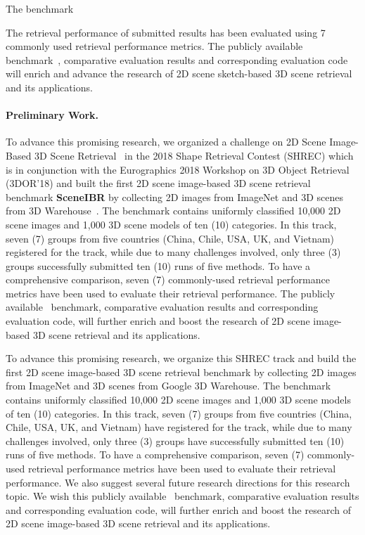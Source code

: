 The benchmark  

The retrieval performance of submitted results has been evaluated using 7 commonly used retrieval performance metrics. The publicly available benchmark~\cite{SHREC18-SceneSBR-Track}, comparative evaluation results and corresponding evaluation code will enrich and advance the research of 2D scene sketch-based 3D scene retrieval and its applications.



\paragraph{Preliminary Work.} 
To advance this promising research, we organized a challenge on 2D Scene Image-Based 3D Scene Retrieval~\cite{DBLP:conf/3dor/AbdulJLL18, SHREC18-SceneIBR-Track} in the 2018 Shape Retrieval Contest (SHREC) which is in conjunction with the Eurographics 2018 Workshop on 3D Object Retrieval (3DOR'18) and built the first 2D scene image-based 3D scene retrieval benchmark \textbf{SceneIBR} by collecting 2D images from ImageNet and 3D scenes from 3D Warehouse~\cite{3DWarehouse}. The benchmark contains uniformly classified 10,000 2D scene images and 1,000 3D scene models of ten (10) categories. In this track, seven (7) groups from five countries (China, Chile, USA, UK, and Vietnam) registered for the track, while due to many challenges involved, only three (3) groups successfully submitted ten (10) runs of five methods. To have a comprehensive comparison, seven (7) commonly-used retrieval performance metrics have been used to evaluate their retrieval performance. The publicly available~\cite{SHREC18-SceneIBR-Track} benchmark, comparative evaluation results and corresponding evaluation code, will further enrich and boost the research of 2D scene image-based 3D scene retrieval and its applications.



To advance this promising research, we organize this SHREC track and build the first 2D scene image-based 3D scene retrieval benchmark by collecting 2D images from ImageNet and 3D scenes from Google 3D Warehouse. The benchmark contains uniformly classified 10,000 2D scene images and 1,000 3D scene models of ten (10) categories. In this track, seven (7) groups from five countries (China, Chile, USA, UK, and Vietnam) have registered for the track, while due to many challenges involved, only three (3) groups have successfully submitted ten (10) runs of five methods. To have a comprehensive comparison, seven (7) commonly-used retrieval performance metrics have been used to evaluate their retrieval performance. We also suggest several future research directions for this research topic. We wish this publicly available~\cite{SHREC18-SceneIBR-Track} benchmark, comparative evaluation results and corresponding evaluation code, will further enrich and boost the research of 2D scene image-based 3D scene retrieval and its applications.



